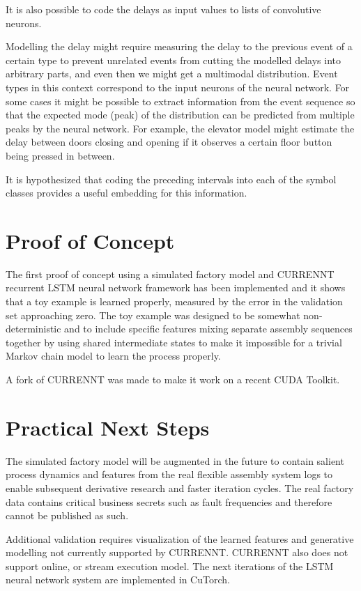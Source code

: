 \documentclass[a4paper,10pt]{article}
\begin{document}
It is also possible to code the delays as input values to lists of convolutive neurons.

Modelling the delay might require measuring the delay to the previous event of a certain type to prevent unrelated events from cutting the modelled delays into arbitrary parts,
and even then we might get a multimodal distribution. Event types in this context correspond to the input neurons of the neural network.
For some cases it might be possible to extract information from the event sequence so that
the expected mode (peak) of the distribution can be predicted from multiple peaks by the neural network. For example,
the elevator model might estimate the delay between doors closing and opening if it observes a certain floor button being pressed in between.

It is hypothesized that coding the preceding intervals into each of the symbol classes provides a useful embedding for this information.

\section{Proof of Concept}

The first proof of concept using a simulated factory model and CURRENNT\cite{CURRENNT} recurrent LSTM neural network framework
has been implemented and it shows that a toy example\cite{PoC}
is learned properly, measured by the error in the validation set approaching zero. The toy example was designed to be somewhat non-deterministic and to include specific
features mixing separate assembly sequences together by using shared intermediate states to make it impossible for a trivial Markov chain model to learn the process properly.

A fork of CURRENNT was made to make it work on a recent CUDA Toolkit\cite{CURRENNTFORK}.

\section{Practical Next Steps}

The simulated factory model will be augmented in the future to contain salient process dynamics and features from the real flexible assembly system logs to enable subsequent
derivative research and faster iteration cycles. The real factory data contains critical business secrets such as fault frequencies and therefore cannot be published as such.

Additional validation requires visualization of the learned features and generative modelling not currently supported by CURRENNT.
CURRENNT also does not support online, or stream execution model. The next iterations of the LSTM neural network system are implemented in CuTorch.
\end{document}
